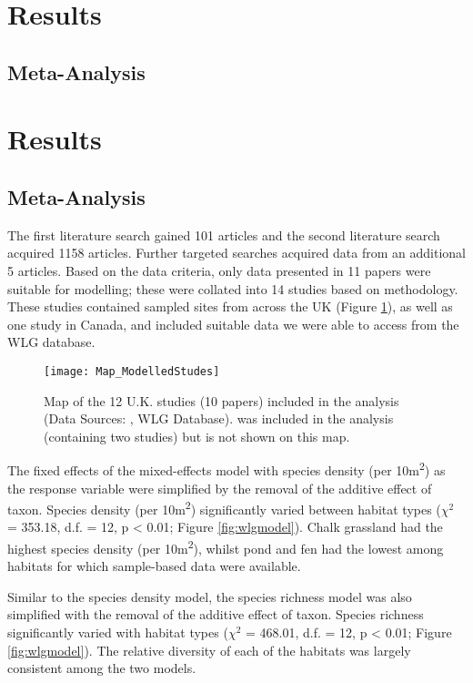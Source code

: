 \ifappendixStyle %
\section{Results}
\subsection{Meta-Analysis}%
\else
\section*{Results}
\subsection*{Meta-Analysis}
\fi

The first literature search gained 101 articles and the second literature search acquired 1158 articles. Further targeted searches acquired data from an additional 5 articles. Based on the data criteria, only data presented in 11 papers were suitable for modelling; these were collated into 14 studies based on methodology. These studies contained sampled sites from across the UK (Figure \ref{fig:wlgmap}), as well as one study in Canada, and included suitable data we were able to access from the WLG database.

\begin{figure}[t]
	\centering
	\texttt{[image: Map\_ModelledStudes]}
	\caption{Map of the 12 U.K. studies (10 papers) included in the analysis (Data Sources: \cite{Petit:1998bc,Wilson:2003aee,Fountain:2004et,Smith:2006ue,Butt:2008ejsb,Williams:2008hb,Scriven:2013ije,Sirohi:2015jic,Speak:2015ufug}, WLG Database). \cite{Macivor:2011ue} was included in the analysis (containing two studies) but is not shown on this map.}
   	 \label{fig:wlgmap}
\end{figure}

The fixed effects of the mixed-effects model with species density (per 10m\textsuperscript{2}) as the response variable were simplified by the removal of the additive effect of taxon. Species density (per 10m\textsuperscript{2}) significantly varied between habitat types ($\chi^2$ = 353.18, d.f. = 12, p < 0.01; Figure \ref{fig:wlgmodel}). Chalk grassland had the highest species density (per 10m\textsuperscript{2}), whilst pond and fen had the lowest among habitats for which sample-based data were available. 

Similar to the species density model, the species richness model was also simplified with the removal of the additive effect of taxon. Species richness significantly varied with habitat types ($\chi^2$ = 468.01, d.f. = 12, p < 0.01; Figure \ref{fig:wlgmodel}). The relative diversity of each of the habitats was largely consistent among the two models.
 	 
